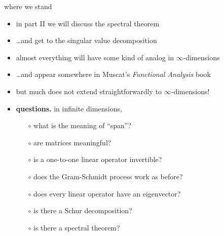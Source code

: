 \documentclass[10pt,hyperref]{beamer}
\begin{document}
\begin{frame}{where we stand}

\begin{itemize}
\item in part II we will discuss the spectral theorem
\item \dots and get to the singular value decomposition
\item almost everything will have some kind of analog in $\infty$-dimensions
\item \dots and appear somewhere in Muscat's \emph{Functional Analysis} book
\item but much does not extend straightforwardly to $\infty$-dimensions!
\item \textbf{questions.} in infinite dimensions,
    \begin{itemize}
    \item[$\circ$] what is the meaning of ``span''?
    \item[$\circ$] are matrices meaningful?
    \item[$\circ$] is a one-to-one linear operator invertible?
    \item[$\circ$] does the Gram-Schmidt process work as before?
    \item[$\circ$] does every linear operator have an eigenvector?
    \item[$\circ$] is there a Schur decomposition?
    \item[$\circ$] is there a spectral theorem?
    \end{itemize}
\end{itemize}
\end{frame}
\end{document}
